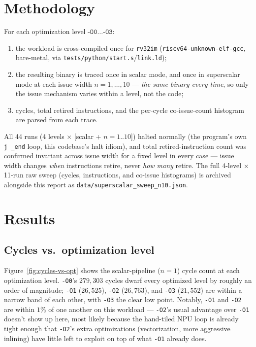 \documentclass[11pt]{article}
\begin{document}
\section{Methodology}

For each optimization level $\texttt{-O0} \ldots \texttt{-O3}$:
\begin{enumerate}
  \item the workload is cross-compiled once for \texttt{rv32im}
    (\texttt{riscv64-unknown-elf-gcc}, bare-metal, via
    \texttt{tests/python/start.s}/\texttt{link.ld});
  \item the resulting binary is traced once in scalar mode, and once in
    superscalar mode at each issue width $n=1,\dots,10$ ---
    \emph{the same binary every time}, so only the issue mechanism varies
    within a level, not the code;
  \item cycles, total retired instructions, and the per-cycle
    co-issue-count histogram are parsed from each trace.
\end{enumerate}
All 44 runs (4 levels $\times$ [scalar + $n{=}1..10$]) halted normally (the
program's own \texttt{j \_end} loop, this codebase's halt idiom), and total
retired-instruction count was confirmed invariant across issue width for a
fixed level in every case --- issue width changes \emph{when} instructions
retire, never \emph{how many} retire. The full 4-level $\times$ 11-run raw
sweep (cycles, instructions, and co-issue histograms) is archived alongside
this report as \texttt{data/superscalar\_sweep\_n10.json}.

\section{Results}

\subsection{Cycles vs.\ optimization level}

Figure~\ref{fig:cycles-vs-opt} shows the scalar-pipeline ($n=1$) cycle count
at each optimization level. \texttt{-O0}'s $279{,}303$ cycles dwarf every
optimized level by roughly an order of magnitude; \texttt{-O1}
($26{,}525$), \texttt{-O2} ($26{,}763$), and \texttt{-O3} ($21{,}552$) are
within a narrow band of each other, with \texttt{-O3} the clear low point.
Notably, \texttt{-O1} and \texttt{-O2} are within $1\%$ of one another on
this workload --- \texttt{-O2}'s usual advantage over \texttt{-O1} doesn't
show up here, most likely because the hand-tiled NPU loop is already tight
enough that \texttt{-O2}'s extra optimizations (vectorization, more
aggressive inlining) have little left to exploit on top of what \texttt{-O1}
already does.
\end{document}
